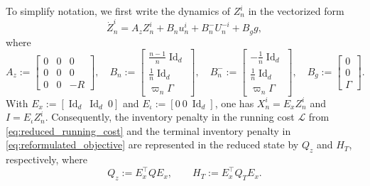 \documentclass[12pt]{article}
\numberwithin{equation}{section}
\theoremstyle{definition}
\begin{document}
To simplify notation, we first write the dynamics of \(Z_n^i\) in the
vectorized form
\begin{equation}\label{eq:fixed_interval_reduced_dynamics}
\dot Z_n^i=A_zZ_n^i+B_nu_n^i+B_n^{-}U_n^{-i}+B_gg,
\end{equation}
where
\[
A_z:=\begin{bmatrix}0&0&0\\0&0&0\\0&0&-R\end{bmatrix},
\quad
B_n:=\begin{bmatrix}\frac{n-1}{n}\operatorname{Id}_d\\
\frac{1}{n}\operatorname{Id}_d\\ \varpi_n\Gamma\end{bmatrix},
\quad
B_n^{-}:=\begin{bmatrix}-\frac{1}{n}\operatorname{Id}_d\\
\frac{1}{n}\operatorname{Id}_d\\ \varpi_n\Gamma\end{bmatrix},
\quad
B_g:=\begin{bmatrix}0\\0\\\Gamma\end{bmatrix}.
\]
With
\(E_x:=[\operatorname{Id}_d\ \operatorname{Id}_d\ 0]\) and
\(E_\iota:=[0\ 0\ \operatorname{Id}_d]\), one has
\(X_n^i=E_xZ_n^i\) and \(I=E_\iota Z_n^i\). Consequently, the inventory
penalty in the running cost \(\mathcal L\) from
\eqref{eq:reduced_running_cost} and the terminal inventory penalty in
\eqref{eq:reformulated_objective} are represented in the reduced state by
\(Q_z\) and \(H_T\), respectively, where
\begin{equation}\label{eq:fixed_interval_final_boundary}
Q_z:=E_x^\top QE_x,
\qquad
H_T:=E_x^\top Q_TE_x.
\end{equation}
\end{document}
